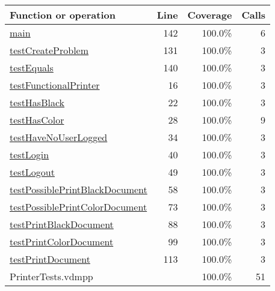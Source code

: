 \bigskip
\begin{longtable}{|l|r|r|r|}
\hline
Function or operation & Line & Coverage & Calls \\
\hline
\hline
\hyperref[main:142]{main} & 142&100.0\% & 6 \\
\hline
\hyperref[testCreateProblem:131]{testCreateProblem} & 131&100.0\% & 3 \\
\hline
\hyperref[testEquals:140]{testEquals} & 140&100.0\% & 3 \\
\hline
\hyperref[testFunctionalPrinter:16]{testFunctionalPrinter} & 16&100.0\% & 3 \\
\hline
\hyperref[testHasBlack:22]{testHasBlack} & 22&100.0\% & 3 \\
\hline
\hyperref[testHasColor:28]{testHasColor} & 28&100.0\% & 9 \\
\hline
\hyperref[testHaveNoUserLogged:34]{testHaveNoUserLogged} & 34&100.0\% & 3 \\
\hline
\hyperref[testLogin:40]{testLogin} & 40&100.0\% & 3 \\
\hline
\hyperref[testLogout:49]{testLogout} & 49&100.0\% & 3 \\
\hline
\hyperref[testPossiblePrintBlackDocument:58]{testPossiblePrintBlackDocument} & 58&100.0\% & 3 \\
\hline
\hyperref[testPossiblePrintColorDocument:73]{testPossiblePrintColorDocument} & 73&100.0\% & 3 \\
\hline
\hyperref[testPrintBlackDocument:88]{testPrintBlackDocument} & 88&100.0\% & 3 \\
\hline
\hyperref[testPrintColorDocument:99]{testPrintColorDocument} & 99&100.0\% & 3 \\
\hline
\hyperref[testPrintDocument:113]{testPrintDocument} & 113&100.0\% & 3 \\
\hline
\hline
PrinterTests.vdmpp & & 100.0\% & 51 \\
\hline
\end{longtable}

